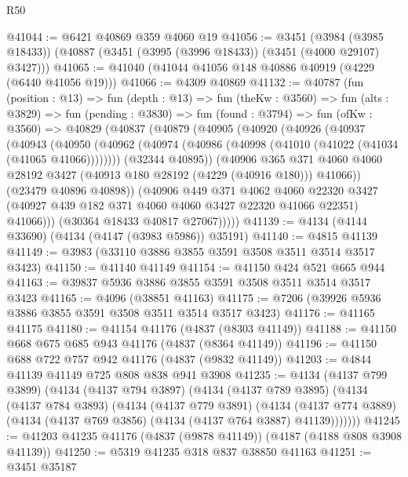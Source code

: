 \begin{lexlean}{R50}
\begin{coremodule}
@41044 := @6421 @40869 @359 @4060 @19
@41056 := @3451
    (@3984 (@3985 @18433))
    (@40887 (@3451 (@3995 (@3996 @18433)) (@3451 (@4000 @29107) @3427)))
@41065 := @41040 (@41044 @41056 @148 @40886 @40919 (@4229 (@6440 @41056 @19)))
@41066 := @4309 @40869
@41132 := @40787
    (fun (position : @13) =>
    fun (depth : @13) =>
    fun (theKw : @3560) =>
    fun (alts : @3829) =>
    fun (pending : @3830) =>
    fun (found : @3794) =>
    fun (ofKw : @3560) =>
    @40829
      (@40837
        (@40879
          (@40905
            (@40920
              (@40926
                (@40937
                  (@40943
                    (@40950
                      (@40962 (@40974 (@40986 (@40998 (@41010 (@41022 (@41034 (@41065 @41066))))))))
                      (@32344 @40895))
                    (@40906
                      @365
                      @371
                      @4060
                      @4060
                      @28192
                      @3427
                      (@40913 @180 @28192 (@4229 (@40916 @180)))
                      @41066))
                  (@23479 @40896 @40898))
                (@40906
                  @449
                  @371
                  @4062
                  @4060
                  @22320
                  @3427
                  (@40927 @439 @182 @371 @4060 @4060 @3427 @22320 @41066 @22351)
                  @41066)))
            (@30364 @18433 @40817 @27067)))))
@41139 := @4134 (@4144 @33690) (@4134 (@4147 (@3983 @5986)) @35191)
@41140 := @4815 @41139
@41149 := @3983 (@33110 @3886 @3855 @3591 @3508 @3511 @3514 @3517 @3423)
@41150 := @41140 @41149
@41154 := @41150 @424 @521 @665 @944
@41163 := @39837 @5936 @3886 @3855 @3591 @3508 @3511 @3514 @3517 @3423
@41165 := @4096 (@38851 @41163)
@41175 := @7206 (@39926 @5936 @3886 @3855 @3591 @3508 @3511 @3514 @3517 @3423)
@41176 := @41165 @41175
@41180 := @41154 @41176 (@4837 (@8303 @41149))
@41188 := @41150 @668 @675 @685 @943 @41176 (@4837 (@8364 @41149))
@41196 := @41150 @688 @722 @757 @942 @41176 (@4837 (@9832 @41149))
@41203 := @4844 @41139 @41149 @725 @808 @838 @941 @3908
@41235 := @4134
    (@4137 @799 @3899)
    (@4134
      (@4137 @794 @3897)
      (@4134
        (@4137 @789 @3895)
        (@4134
          (@4137 @784 @3893)
          (@4134
            (@4137 @779 @3891)
            (@4134
              (@4137 @774 @3889)
              (@4134 (@4137 @769 @3856) (@4134 (@4137 @764 @3887) @41139)))))))
@41245 := @41203 @41235 @41176 (@4837 (@9878 @41149)) (@4187 (@4188 @808 @3908 @41139))
@41250 := @5319 @41235 @318 @837 @38850 @41163
@41251 := @3451 @35187

\end{coremodule}
\end{lexlean}
